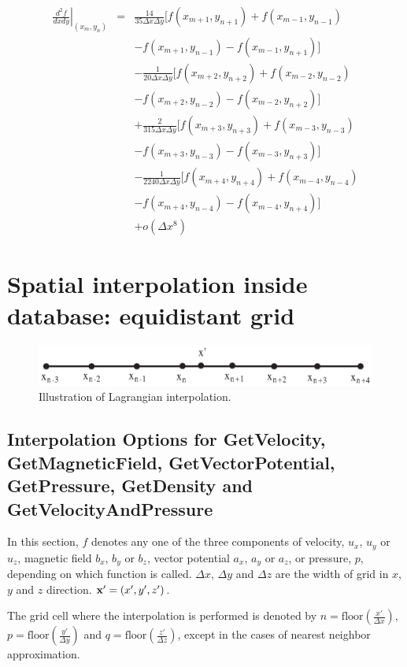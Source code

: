 \documentclass[11pt]{article}
\def\bea{\begin{eqnarray}}
\def\eea{\end{eqnarray}}
\begin{document}
\bea \left.\frac{d^2f}{dxdy}\right|_{(x_m,y_n)} &=&
\frac{14}{35\Delta
x\Delta y}[f(x_{m+1},y_{n+1})+f(x_{m-1},y_{n-1})\nonumber\\
&&-f(x_{m+1},y_{n-1})-f(x_{m-1},y_{n+1})]\nonumber\\
&&-\frac{1}{20\Delta
x\Delta y}[f(x_{m+2},y_{n+2})+f(x_{m-2},y_{n-2})\nonumber\\
&&-f(x_{m+2},y_{n-2})-f(x_{m-2},y_{n+2})]\nonumber\\
&&+\frac{2}{315\Delta
x\Delta y}[f(x_{m+3},y_{n+3})+f(x_{m-3},y_{n-3})\nonumber\\
&&-f(x_{m+3},y_{n-3})-f(x_{m-3},y_{n+3})]\nonumber\\
&&-\frac{1}{2240\Delta
x\Delta y}[f(x_{m+4},y_{n+4})+f(x_{m-4},y_{n-4})\nonumber\\
&&-f(x_{m+4},y_{n-4})-f(x_{m-4},y_{n+4})]\nonumber\\
&&+o(\Delta x^8) \eea

\section{Spatial interpolation inside database: equidistant grid}
\label{sec:spa}
\begin{figure}[h]
\begin{minipage}{\linewidth}
\centering\includegraphics[width=1.0\linewidth]{Lagrangian.eps}
\end{minipage} \caption{Illustration of Lagrangian interpolation. }\label{Lagrangian}
\end{figure}
\subsection{Interpolation Options for GetVelocity, GetMagneticField, GetVectorPotential, GetPressure, GetDensity and GetVelocityAndPressure}
In this section, $f$ denotes any one of the three components of
velocity, $u_x$, $u_y$ or $u_z$, magnetic field $b_x$, $b_y$ or $b_z$, vector potential $a_x$, $a_y$ or $a_z$, or pressure, $p$,  depending on which
function is called. $\Delta x$, $\Delta y$ and $\Delta z$ are the
width of grid in $x$, $y$ and $z$ direction. ${\bf x'}=(x',y',z')$.

The grid cell where the interpolation is performed is denoted by
$n = \textrm{floor}\left(\frac{x'}{\Delta x}\right)$,
$p = \textrm{floor}\left(\frac{y'}{\Delta y}\right)$ and
$q = \textrm{floor}\left(\frac{z'}{\Delta z}\right)$,
except in the cases of nearest neighbor approximation.
\end{document}

